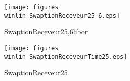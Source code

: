 \begin{figure}[htbp]
	\centering
		\texttt{[image: figures\\winlin SwaptionReceveur25\_6.eps]}
	\caption{SwaptionReceveur25,6libor}
	\label{fig:SwaptionReceveur25_6}
\end{figure}
\begin{figure}[htbp]
	\centering
		\texttt{[image: figures\\winlin SwaptionReceveurTime25.eps]}
	\caption{SwaptionReceveur25}
	\label{fig:SwaptionReceveurTime25}
\end{figure}



